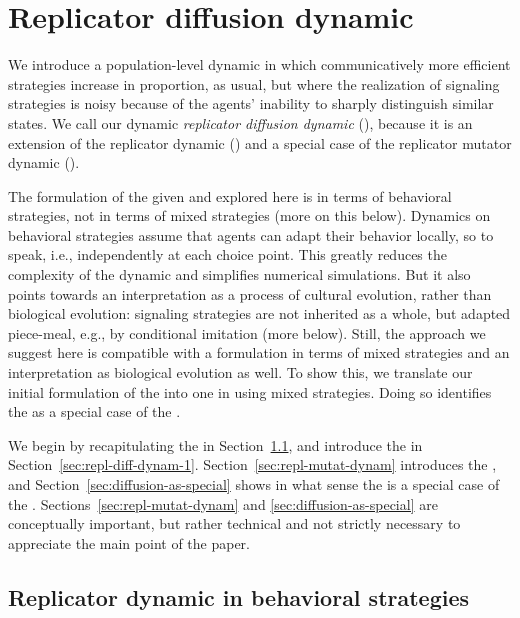 \documentclass[fleqn,reqno,10pt]{article}
\newcommand{\rd}{\acro{rd}} %
\newcommand{\rmd}{\acro{rmd}} %
\newcommand{\rdd}{\acro{rdd}} %
\begin{document}

\section{Replicator diffusion dynamic}
\label{sec:repl-diff-dynam}

We introduce a population-level dynamic in which communicatively more
efficient strategies increase in proportion, as usual, but where the
realization of signaling strategies is noisy because of the agents'
inability to sharply distinguish similar states. We call our dynamic
\emph{replicator diffusion dynamic} (\rdd), because it is an extension
of the replicator dynamic (\rd) and a special case of the replicator
mutator dynamic (\rmd).

The formulation of the \rdd given and explored here is in terms of
behavioral strategies, not in terms of mixed strategies (more on this
below). Dynamics on behavioral strategies assume that agents can adapt
their behavior locally, so to speak, i.e., independently at each
choice point. This greatly reduces the complexity of the dynamic and
simplifies numerical simulations. But it also points towards an
interpretation as a process of cultural evolution, rather than
biological evolution: signaling strategies are not inherited as a
whole, but adapted piece-meal, e.g., by conditional imitation (more
below). Still, the approach we suggest here is compatible with a
formulation in terms of mixed strategies and an interpretation as
biological evolution as well. To show this, we translate our initial
formulation of the \rdd into one in using mixed strategies. Doing so
identifies the \rdd as a special case of the \rmd.

We begin by recapitulating the \rd in
Section~\ref{sec:repl-dynam-behav}, and introduce the \rdd in
Section~\ref{sec:repl-diff-dynam-1}.
Section~\ref{sec:repl-mutat-dynam} introduces the \rmd, and
Section~\ref{sec:diffusion-as-special} shows in what sense the \rdd is
a special case of the \rmd. Sections~\ref{sec:repl-mutat-dynam} and
\ref{sec:diffusion-as-special} are conceptually important, but rather
technical and not strictly necessary to appreciate the main point of
the paper.

\subsection{Replicator dynamic in behavioral strategies}
\label{sec:repl-dynam-behav}
\end{document}

